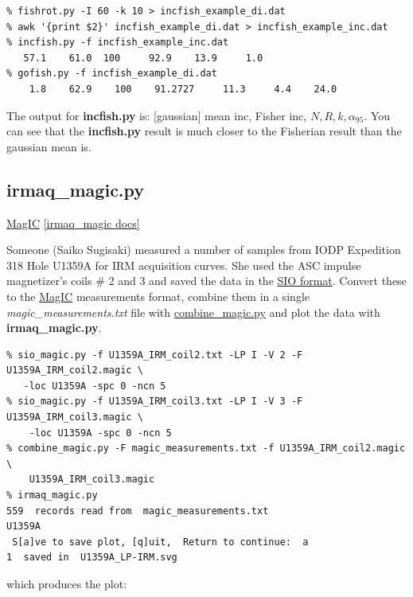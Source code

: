 \documentclass[11pt]{book}
\begin{document}
{{\begin{verbatim}
% fishrot.py -I 60 -k 10 > incfish_example_di.dat
% awk '{print $2}' incfish_example_di.dat > incfish_example_inc.dat
% incfish.py -f incfish_example_inc.dat
   57.1    61.0  100     92.9    13.9     1.0
% gofish.py -f incfish_example_di.dat
    1.8    62.9    100    91.2727     11.3     4.4    24.0
\end{verbatim}

The output for {\bf incfish.py} is:  [gaussian] mean inc, Fisher inc, $N, R, k, \alpha_{95}$.  You can see that the {\bf incfish.py} result is much closer to the Fisherian result than the gaussian mean is.

\subsection{irmaq\_magic.py}
\href{#MagIC}{MagIC}
\href{https://github.com/PmagPy/PmagPy/blob/master/programs/irmaq_magic.py}{[irmaq\_magic docs]}

Someone (Saiko Sugisaki) measured a number of samples from IODP Expedition 318 Hole U1359A for IRM acquisition curves.  She used the ASC impulse magnetizer's coils \# 2 and 3 and saved the data in the \href{#sio_magic.py}{SIO format}.   Convert these to the \href{#MagIC}{MagIC} measurements  format, combine them in a  single {\it magic\_measurements.txt} file with \href{#combine_magic.py}{combine\_magic.py} and plot the data with {\bf irmaq\_magic.py}.

\begin{verbatim}
% sio_magic.py -f U1359A_IRM_coil2.txt -LP I -V 2 -F U1359A_IRM_coil2.magic \
   -loc U1359A -spc 0 -ncn 5
% sio_magic.py -f U1359A_IRM_coil3.txt -LP I -V 3 -F U1359A_IRM_coil3.magic \
    -loc U1359A -spc 0 -ncn 5
% combine_magic.py -F magic_measurements.txt -f U1359A_IRM_coil2.magic \
    U1359A_IRM_coil3.magic
% irmaq_magic.py
559  records read from  magic_measurements.txt
U1359A
 S[a]ve to save plot, [q]uit,  Return to continue:  a
1  saved in  U1359A_LP-IRM.svg
\end{verbatim}

which produces the plot:

}}
\end{document}
